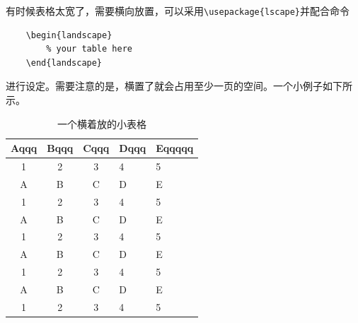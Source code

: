 有时候表格太宽了，需要横向放置，可以采用\verb|\usepackage{lscape}|并配合命令
\begin{verbatim}
	\begin{landscape}
		% your table here
	\end{landscape}
\end{verbatim}
进行设定。需要注意的是，横置了就会占用至少一页的空间。一个小例子如下所示。
	\begin{landscape}
	\begin{table}
		\centering
		\caption{一个横着放的小表格}
		\begin{tabular}{cccp{2cm}p{2cm}}
			\hline
			Aqqq & Bqqq & Cqqq & Dqqq & Eqqqqq \\
			\hline
			1 & 2 & 3 & 4 & 5\\
			A & B & C & D & E \\
			1 & 2 & 3 & 4 & 5\\
			A & B & C & D & E \\
			1 & 2 & 3 & 4 & 5\\
			A & B & C & D & E \\
			1 & 2 & 3 & 4 & 5\\
			A & B & C & D & E \\
			1 & 2 & 3 & 4 & 5\\
			\hline
		\end{tabular}
	\end{table}
\end{landscape}
